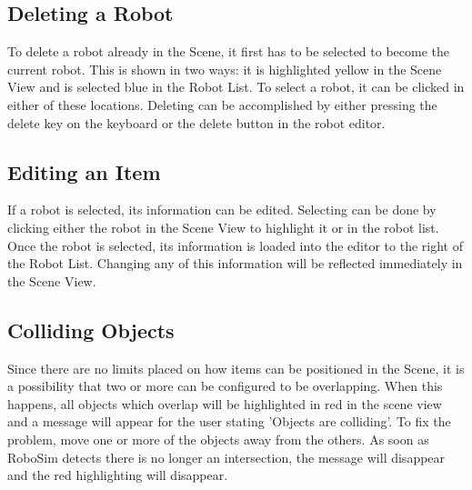 \documentclass{article}
\begin{document}
\subsection{Deleting a Robot}
To delete a robot already in the Scene, it first has to be selected to become
the current robot.  This is shown in two ways: it is highlighted yellow in the
Scene View and is selected blue in the Robot List.  To select a robot, it can
be clicked in either of these locations.  Deleting can be accomplished by
either pressing the delete key on the keyboard or the delete button in the
robot editor.

\subsection{Editing an Item}
If a robot is selected, its information can be edited.  Selecting can be done
by clicking either the robot in the Scene View to highlight it or in the robot
list.  Once the robot is selected, its information is loaded into the editor to
the right of the Robot List.  Changing any of this information will be
reflected immediately in the Scene View.

\subsection{Colliding Objects}
Since there are no limits placed on how items can be positioned in the Scene,
it is a possibility that two or more can be configured to be overlapping.  When
this happens, all objects which overlap will be highlighted in red in the scene
view and a message will appear for the user stating 'Objects are colliding'.
To fix the problem, move one or more of the objects away from the others.  As
soon as RoboSim detects there is no longer an intersection, the message will
disappear and the red highlighting will disappear.

%
%
\end{document}
